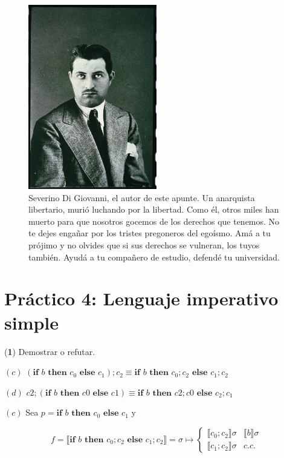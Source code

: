 \documentclass[a4paper, 12pt]{article}
\begin{document}
 \begin{figure}[h!]
 \centering
  \includegraphics[width=0.5\textwidth]{../Images/SeverinoDiGiovanni.jpg}
 \caption{Severino Di Giovanni, el autor de este apunte. Un anarquista
   libertario, murió luchando por la libertad. Como él, otros miles han muerto
   para que nosotros gocemos de los derechos que tenemos. No te dejes engañar
   por los tristes pregoneros del egoísmo. Amá a tu prójimo y no olvides que si
   sus derechos se vulneran, los tuyos también. Ayudá a tu compañero de estudio,
 defendé tu universidad. }
 \end{figure}

\pagebreak
\tableofcontents
\newpage

\section{Práctico 4: Lenguaje imperativo simple}

\begin{myframe}
(\textbf{1}) Demostrar o refutar.

$(c)$ $(\textbf{if } b \textbf{ then } c_0 \textbf{ else } c_1);c_2 \equiv
\textbf{if } b \textbf{ then } c_0;c_2 \textbf{ else } c_1;c_2$

$(d)$ $c2; (\textbf{if } b \textbf{ then } c0 \textbf{ else } c1) \equiv \textbf{if } b
\textbf{ then } c2; c0 \textbf{ else } c_2; c_1$
\end{myframe}


$(c)$ Sea $p = \textbf{if } b \textbf{ then } c_0 \textbf{ else } c_1$ y

\begin{equation*}
  f = \llbracket \textbf{if } b \textbf{ then } c_0;c_2 \textbf{ else } c_1;c_2
  \rrbracket = \sigma \mapsto \begin{cases}
    \llbracket c_0;c_2 \rrbracket \sigma & \llbracket b \rrbracket \sigma \\ 
    \llbracket c_1;c_2 \rrbracket \sigma & c.c.
  \end{cases}
\end{equation*}
\end{document}
